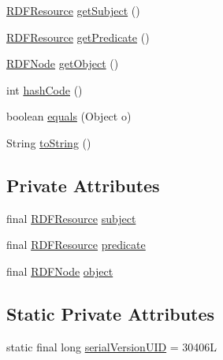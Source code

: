 \begin{DoxyCompactItemize}
\item 
\hyperlink{classorg_1_1semanticweb_1_1owlapi_1_1io_1_1_r_d_f_resource}{R\-D\-F\-Resource} \hyperlink{classorg_1_1semanticweb_1_1owlapi_1_1io_1_1_r_d_f_triple_ad4e9f0e613341ee1cfbdb43469ae29aa}{get\-Subject} ()
\item 
\hyperlink{classorg_1_1semanticweb_1_1owlapi_1_1io_1_1_r_d_f_resource}{R\-D\-F\-Resource} \hyperlink{classorg_1_1semanticweb_1_1owlapi_1_1io_1_1_r_d_f_triple_abd1568c95a21cd3d3a5cf7eb979c3529}{get\-Predicate} ()
\item 
\hyperlink{classorg_1_1semanticweb_1_1owlapi_1_1io_1_1_r_d_f_node}{R\-D\-F\-Node} \hyperlink{classorg_1_1semanticweb_1_1owlapi_1_1io_1_1_r_d_f_triple_ab2b434035201185677574ebc70ea067d}{get\-Object} ()
\item 
int \hyperlink{classorg_1_1semanticweb_1_1owlapi_1_1io_1_1_r_d_f_triple_af10c65dde344388f198fb56597aee549}{hash\-Code} ()
\item 
boolean \hyperlink{classorg_1_1semanticweb_1_1owlapi_1_1io_1_1_r_d_f_triple_addf38cc6f4444ce3b65b53ce1c622997}{equals} (Object o)
\item 
String \hyperlink{classorg_1_1semanticweb_1_1owlapi_1_1io_1_1_r_d_f_triple_ac6982e2b918857ef6145066a9276b0fd}{to\-String} ()
\end{DoxyCompactItemize}
\subsection*{Private Attributes}
\begin{DoxyCompactItemize}
\item 
final \hyperlink{classorg_1_1semanticweb_1_1owlapi_1_1io_1_1_r_d_f_resource}{R\-D\-F\-Resource} \hyperlink{classorg_1_1semanticweb_1_1owlapi_1_1io_1_1_r_d_f_triple_adc6a953293f76094fcc24c18cc4ffec3}{subject}
\item 
final \hyperlink{classorg_1_1semanticweb_1_1owlapi_1_1io_1_1_r_d_f_resource}{R\-D\-F\-Resource} \hyperlink{classorg_1_1semanticweb_1_1owlapi_1_1io_1_1_r_d_f_triple_a84ba3a9f9aa5c9345c69815d0cb03676}{predicate}
\item 
final \hyperlink{classorg_1_1semanticweb_1_1owlapi_1_1io_1_1_r_d_f_node}{R\-D\-F\-Node} \hyperlink{classorg_1_1semanticweb_1_1owlapi_1_1io_1_1_r_d_f_triple_aac519c8788a3d08a03aaca7006a041d8}{object}
\end{DoxyCompactItemize}
\subsection*{Static Private Attributes}
\begin{DoxyCompactItemize}
\item 
static final long \hyperlink{classorg_1_1semanticweb_1_1owlapi_1_1io_1_1_r_d_f_triple_a5191bd4b887c8568e9fe7a6a136ca29f}{serial\-Version\-U\-I\-D} = 30406\-L
\end{DoxyCompactItemize}


